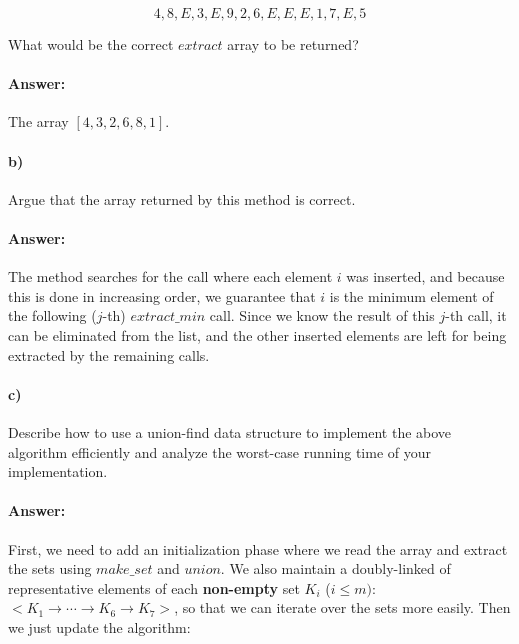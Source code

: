 \documentclass[a4paper]{article}
\begin{document}
$$4,8,E,3,E,9,2,6,E,E,E,1,7,E,5$$

What would be the correct $extract$ array to be returned?

\paragraph{Answer:} The array $[4, 3, 2, 6, 8, 1]$.

\paragraph{b)} Argue that the array returned by this method is correct.

\paragraph{Answer:} The method searches for the call where each element $i$ was inserted, and because this is done in increasing order, we guarantee that $i$ is the minimum element of the following ($j$-th) $extract\_min$ call. Since we know the result of this $j$-th call, it can be eliminated from the list, and the other inserted elements are left for being extracted by the remaining calls.

\paragraph{c)} Describe how to use a union-find data structure to implement the above algorithm efficiently and analyze the worst-case running time of your implementation. 

\paragraph{Answer:} First, we need to add an initialization phase where we read the array and extract the sets using $make\_set$ and $union$. We also maintain a doubly-linked of representative elements of each \textbf{non-empty} set $K_i$ ($i \le m)$: $<K_1 \rightarrow \cdots \rightarrow K_6  \rightarrow K_7>$, so that we can iterate over the sets more easily. Then we just update the algorithm:
\end{document}
